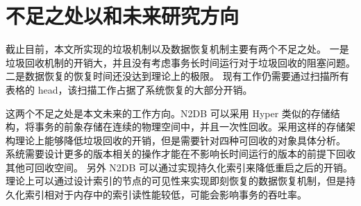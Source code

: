 \section{不足之处以和未来研究方向}

截止目前，本文所实现的垃圾机制以及数据恢复机制主要有两个不足之处。
一是垃圾回收机制的开销大，并且没有考虑事务长时间运行对于垃圾回收的阻塞问题。
二是数据恢复的恢复时间还没达到理论上的极限。
现有工作仍需要通过扫描所有表格的 head，该扫描工作占据了系统恢复的大部分开销。

这两个不足之处是本文未来的工作方向。N2DB 可以采用 Hyper 类似的存储结构，将事务的前象存储在连续的物理空间中，并且一次性回收。采用这样的存储架构理论上能够降低垃圾回收的开销，但是需要针对四种可回收的对象具体分析。
系统需要设计更多的版本相关的操作才能在不影响长时间运行的版本的前提下回收其他可回收空间。
另外 N2DB 可以通过实现持久化索引来降低重启之后的开销。理论上可以通过设计索引的节点的可见性来实现即刻恢复的数据恢复机制，但是持久化索引相对于内存中的索引读性能较低，可能会影响事务的吞吐率。
